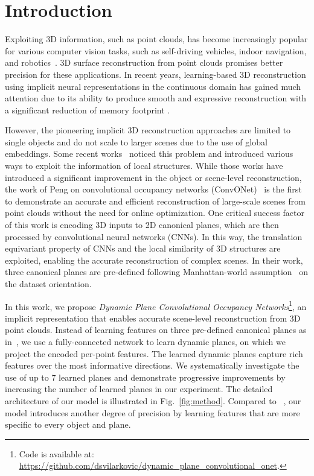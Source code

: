 \documentclass[10pt,twocolumn,letterpaper]{article}
\begin{document}
\section{Introduction}\label{sec:intro}

Exploiting 3D information, such as point clouds, has become increasingly popular for various computer vision tasks, such as self-driving vehicles, indoor navigation, and robotics~\cite{boss, indoor}. 3D surface reconstruction from point clouds promises better precision for these applications. In recent years, learning-based 3D reconstruction using implicit neural representations in the continuous domain has gained much attention due to its ability to produce smooth and expressive reconstruction with a significant reduction of memory footprint \cite{chibane2020implicit, mescheder2018occupancy, peng2020convolutional}.

However, the pioneering implicit 3D reconstruction approaches are limited to single objects and do not scale to larger scenes due to the use of global embeddings. Some recent works~\cite{chabra2020deep, chibane2020implicit, genova2020local, jiang2020local, peng2020convolutional} noticed this problem and introduced various ways to exploit the information of local structures. While those works have introduced a significant improvement in the object or scene-level reconstruction, the work of Peng \etal on convolutional occupancy networks (ConvONet)~\cite{peng2020convolutional} is the first to demonstrate an accurate and efficient reconstruction of large-scale scenes from point clouds without the need for online optimization. 
One critical success factor of this work is encoding 3D inputs to 2D canonical planes, which are then processed by convolutional neural networks (CNNs).
In this way, the translation equivariant property of CNNs and the local similarity of 3D structures are exploited, enabling the accurate reconstruction of complex scenes. In their work, three canonical planes are pre-defined following Manhattan-world assumption~\cite{coughlan1999manhattan} on the dataset orientation.

In this work, we propose \emph{Dynamic Plane Convolutional Occupancy Networks}\footnote{
Code is available at: \url{https://github.com/dsvilarkovic/dynamic_plane_convolutional_onet}.}, an implicit representation that enables accurate scene-level reconstruction from 3D point clouds. Instead of learning features on three pre-defined canonical planes as in~\cite{peng2020convolutional}, we use a fully-connected network to learn dynamic planes, on which we project the encoded per-point features. The learned dynamic planes capture rich features over the most informative directions. We systematically investigate the use of up to 7 learned planes and demonstrate progressive improvements by increasing the number of learned planes in our experiment. The detailed architecture of our model is illustrated in Fig.~\ref{fig:method}. Compared to ~\cite{peng2020convolutional}, our model introduces another degree of precision by learning features that are more specific to every object and plane.
\end{document}
